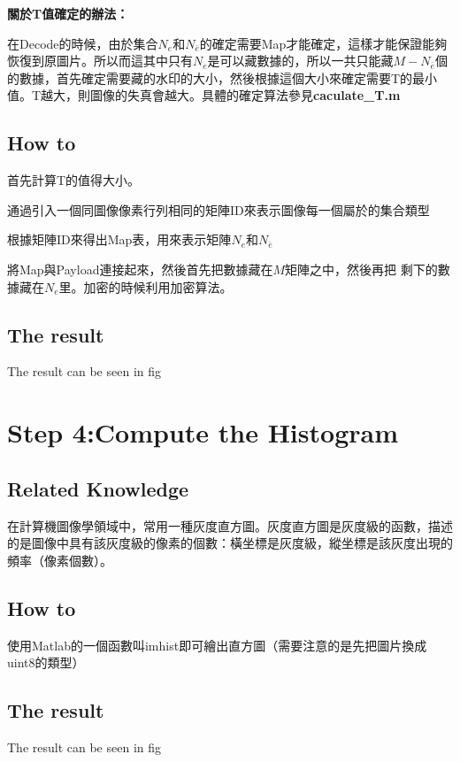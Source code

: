 \documentclass[a4paper,12pt]{article}%
\begin{document}
\textbf{關於T值確定的辦法：}

    在Decode的時候，由於集合$N_e$和$N_{\bar{e}}$的確定需要Map才能確定，這樣才能保證能夠恢復到原圖片。所以而這其中只有$N_e$是可以藏數據的，所以一共只能藏$M - N_{\bar{e}}$個的數據，首先確定需要藏的水印的大小，然後根據這個大小來確定需要T的最小值。T越大，則圖像的失真會越大。具體的確定算法參見\textbf{caculate\_T.m}

\subsection{How to}

\begin{description}
\setlength{\itemsep}{0pt}
\setlength{\parskip}{0pt}
\setlength{\parsep}{0pt}
      \item[Step0]首先計算T的值得大小。
      \item[Step1]通過引入一個同圖像像素行列相同的矩陣ID來表示圖像每一個屬於的集合類型
      \item[Step2]根據矩陣ID來得出Map表，用來表示矩陣$N_e$和$N_{\bar{e}}$
      \item[Step3]將Map與Payload連接起來，然後首先把數據藏在$M$矩陣之中，然後再把
剩下的數據藏在$N_e$里。加密的時候利用加密算法。%
\end{description}

\subsection{The result}
    The result can be seen in fig

\section{Step 4:Compute the Histogram}
    \subsection{Related Knowledge}
        在計算機圖像學領域中，常用一種灰度直方圖。灰度直方圖是灰度級的函數，描述的是圖像中具有該灰度級的像素的個數：橫坐標是灰度級，縱坐標是該灰度出現的頻率（像素個數）。
    \subsection{How to}
        使用Matlab的一個函數叫imhist即可繪出直方圖（需要注意的是先把圖片換成uint8的類型）
    \subsection{The result}
        The result can be seen in fig
        
\end{document}
